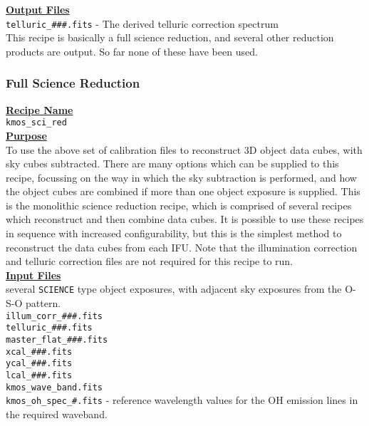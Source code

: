 \documentclass{literature}
\begin{document}
\noindent
\textbf{\underline{Output Files}} \\	
\noindent
{\tt{telluric\_\#\#\#.fits}} - The derived telluric correction spectrum \\
\noindent
This recipe is basically a full science reduction, and several other reduction products are output. So far none of these have been used. 

\subsubsection{Full Science Reduction}\label{subsubsec:sci_red}
\textbf{\underline{Recipe Name}} \\		
\noindent
{\tt{kmos\_sci\_red}} \\

\noindent
\textbf{\underline{Purpose}} \\	
\noindent 
To use the above set of calibration files to reconstruct 3D object data cubes, with sky cubes subtracted. There are many options which can be supplied to this recipe, focussing on the way in which the sky subtraction is performed, and how the object cubes are combined if more than one object exposure is supplied. This is the monolithic science reduction recipe, which is comprised of several recipes which reconstruct and then combine data cubes. It is possible to use these recipes in sequence with increased configurability, but this is the simplest method to reconstruct the data cubes from each IFU. Note that the illumination correction and telluric correction files are not required for this recipe to run. \\

\noindent
\textbf{\underline{Input Files}} \\	
\noindent 
several {\tt{SCIENCE}} type object exposures, with adjacent sky exposures from the O-S-O pattern.  \\ 
\noindent
{\tt{illum\_corr\_\#\#\#.fits}}\\
\noindent
{\tt{telluric\_\#\#\#.fits}}\\
\noindent
{\tt{master\_flat\_\#\#\#.fits}}\\
\noindent
{\tt{xcal\_\#\#\#.fits}}\\
\noindent
{\tt{ycal\_\#\#\#.fits}}\\
\noindent
{\tt{lcal\_\#\#\#.fits}}\\
\noindent
{\tt{kmos\_wave\_band.fits}}\\ 
\noindent
{\tt{kmos\_oh\_spec\_\#.fits}} - reference wavelength values for the OH emission lines in the required waveband.\\ 
\end{document}

